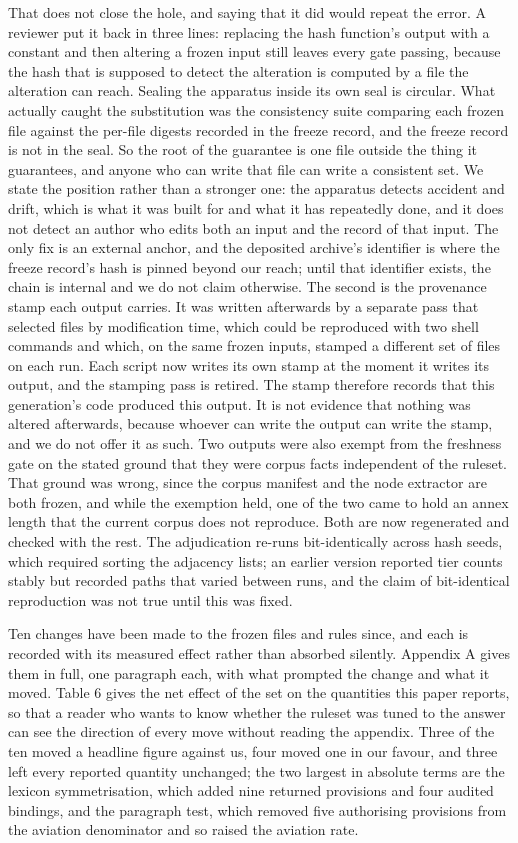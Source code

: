 That does not close the hole, and saying that it did would repeat the error. A reviewer put it back in three lines: replacing the hash function's output with a constant and then altering a frozen input still leaves every gate passing, because the hash that is supposed to detect the alteration is computed by a file the alteration can reach. Sealing the apparatus inside its own seal is circular. What actually caught the substitution was the consistency suite comparing each frozen file against the per-file digests recorded in the freeze record, and the freeze record is not in the seal. So the root of the guarantee is one file outside the thing it guarantees, and anyone who can write that file can write a consistent set. We state the position rather than a stronger one: the apparatus detects accident and drift, which is what it was built for and what it has repeatedly done, and it does not detect an author who edits both an input and the record of that input. The only fix is an external anchor, and the deposited archive's identifier is where the freeze record's hash is pinned beyond our reach; until that identifier exists, the chain is internal and we do not claim otherwise. The second is the provenance stamp each output carries. It was written afterwards by a separate pass that selected files by modification time, which could be reproduced with two shell commands and which, on the same frozen inputs, stamped a different set of files on each run. Each script now writes its own stamp at the moment it writes its output, and the stamping pass is retired. The stamp therefore records that this generation's code produced this output. It is not evidence that nothing was altered afterwards, because whoever can write the output can write the stamp, and we do not offer it as such. Two outputs were also exempt from the freshness gate on the stated ground that they were corpus facts independent of the ruleset. That ground was wrong, since the corpus manifest and the node extractor are both frozen, and while the exemption held, one of the two came to hold an annex length that the current corpus does not reproduce. Both are now regenerated and checked with the rest. The adjudication re-runs bit-identically across hash seeds, which required sorting the adjacency lists; an earlier version reported tier counts stably but recorded paths that varied between runs, and the claim of bit-identical reproduction was not true until this was fixed.

Ten changes have been made to the frozen files and rules since, and each is recorded with its measured effect rather than absorbed silently. Appendix A gives them in full, one paragraph each, with what prompted the change and what it moved. Table 6 gives the net effect of the set on the quantities this paper reports, so that a reader who wants to know whether the ruleset was tuned to the answer can see the direction of every move without reading the appendix. Three of the ten moved a headline figure against us, four moved one in our favour, and three left every reported quantity unchanged; the two largest in absolute terms are the lexicon symmetrisation, which added nine returned provisions and four audited bindings, and the paragraph test, which removed five authorising provisions from the aviation denominator and so raised the aviation rate.

